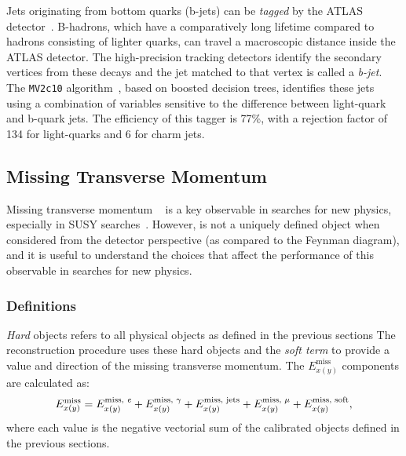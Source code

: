 Jets originating from bottom quarks (b-jets) can be \textit{tagged} by the ATLAS detector~\cite{Aad:2015ydr,ATL-PHYS-PUB-2016-012}.
B-hadrons, which have a comparatively long lifetime compared to hadrons consisting of lighter quarks, can travel a macroscopic distance inside the ATLAS detector.
The high-precision tracking detectors identify the secondary vertices from these decays and the jet matched to that vertex is called a \textit{b-jet}.
The \texttt{MV2c10} algorithm~\cite{Aad:2015ydr,ATL-PHYS-PUB-2016-012}, based on boosted decision trees, identifies these jets using a combination of variables sensitive to the difference between light-quark and b-quark jets.
The efficiency of this tagger is 77\%, with a rejection factor of 134 for light-quarks and 6 for charm jets.

\subsection{Missing Transverse Momentum}

Missing transverse momentum \met ~\cite{Aad:2016nrq} is a key observable in searches for new physics, especially in SUSY searches~\cite{ATL-PHYS-PUB-2010-010,ATL-PHYS-PUB-2015-005}.
However, \met is not a uniquely defined object when considered from the detector perspective (as compared to the Feynman diagram), and it is useful to understand the choices that affect the performance of this observable in searches for new physics.

\subsubsection{\met Definitions}

\textit{Hard} objects refers to all physical objects as defined in the previous sections
The \met reconstruction procedure uses these hard objects and the \textit{soft term} to provide a value and direction of the missing transverse momentum.
The $E^{\text{miss}}_{x(y)}$ components are calculated as:
\begin{equation}
  \Emiss{x(y)} = \Emisscomp{x(y)}{\text{\textit{e}}}
               + \Emisscomp{x(y)}{\gamma}
               + \Emisscomp{x(y)}{\text{jets}}
               + \Emisscomp{x(y)}{\mu}
               + \Emisscomp{x(y)}{\text{soft}},
  \label{eq:met-sum}
\end{equation}
where each value  is the negative vectorial sum of the calibrated objects defined in the previous sections.

